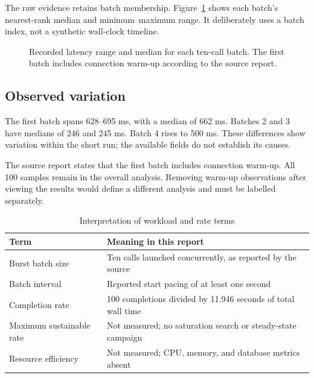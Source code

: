 The raw evidence retains batch membership. Figure~\ref{fig:batch} shows each batch's nearest-rank median and minimum--maximum range. It deliberately uses a batch index, not a synthetic wall-clock timeline.

\begin{figure}[h]\centering\caption{Recorded latency range and median for each ten-call batch. The first batch includes connection warm-up according to the source report.}\label{fig:batch}\end{figure}

\subsection*{Observed variation}
The first batch spans 628--695 ms, with a median of 662 ms. Batches 2 and 3 have medians of 246 and 245 ms. Batch 4 rises to 500 ms. These differences show variation within the short run; the available fields do not establish its causes.

The source report states that the first batch includes connection warm-up. All 100 samples remain in the overall analysis. Removing warm-up observations after viewing the results would define a different analysis and must be labelled separately.

\begin{table}[h]\caption{Interpretation of workload and rate terms}\EvidenceTableStart
\begin{tabularx}{\linewidth}{@{}P{38mm}X@{}}\toprule
Term & Meaning in this report\\\midrule
Burst batch size & Ten calls launched concurrently, as reported by the source\\
Batch interval & Reported start pacing of at least one second\\
Completion rate & 100 completions divided by 11.946 seconds of total wall time\\
Maximum sustainable rate & Not measured; no saturation search or steady-state campaign\\
Resource efficiency & Not measured; CPU, memory, and database metrics absent\\\bottomrule
\end{tabularx}\end{table}

